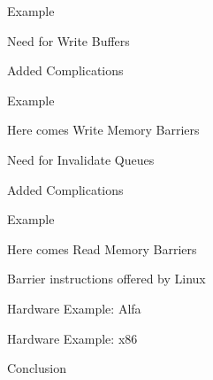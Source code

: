 \documentclass[notes, xcolor = dvipsnames]{beamer}
\begin{document}
    \begin{frame}{Example}
        
    \end{frame}

    \begin{frame}{Need for Write Buffers}
        
    \end{frame}

    \begin{frame}{Added Complications}
        
    \end{frame}

    \begin{frame}{Example}

    \end{frame}

    \begin{frame}{Here comes Write Memory Barriers}
        
    \end{frame}

    \begin{frame}{Need for Invalidate Queues}
        
    \end{frame}

    \begin{frame}{Added Complications}
        
    \end{frame}

    \begin{frame}{Example}
        
    \end{frame}

    \begin{frame}{Here comes Read Memory Barriers}
        
    \end{frame}

    \begin{frame}{Barrier instructions offered by Linux}
        
    \end{frame}

    \begin{frame}{Hardware Example: Alfa}
        
    \end{frame}

    \begin{frame}{Hardware Example: x86}
    
    \end{frame}

    \begin{frame}{Conclusion}
        
    \end{frame}
\end{document}
